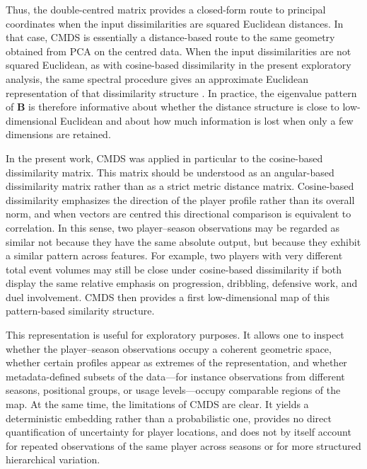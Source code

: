 Thus, the double-centred matrix provides a closed-form route to principal coordinates when the input dissimilarities are squared Euclidean distances. In that case, CMDS is essentially a distance-based route to the same geometry obtained from PCA on the centred data. When the input dissimilarities are not squared Euclidean, as with cosine-based dissimilarity in the present exploratory analysis, the same spectral procedure gives an approximate Euclidean representation of that dissimilarity structure \cite{cox2001mds,borg2005mds}. In practice, the eigenvalue pattern of $\mathbf{B}$ is therefore informative about whether the distance structure is close to low-dimensional Euclidean and about how much information is lost when only a few dimensions are retained.

In the present work, CMDS was applied in particular to the cosine-based dissimilarity matrix. This matrix should be understood as an angular-based dissimilarity matrix rather than as a strict metric distance matrix. Cosine-based dissimilarity emphasizes the direction of the player profile rather than its overall norm, and when vectors are centred this directional comparison is equivalent to correlation. In this sense, two player--season observations may be regarded as similar not because they have the same absolute output, but because they exhibit a similar pattern across features. For example, two players with very different total event volumes may still be close under cosine-based dissimilarity if both display the same relative emphasis on progression, dribbling, defensive work, and duel involvement. CMDS then provides a first low-dimensional map of this pattern-based similarity structure.

This representation is useful for exploratory purposes. It allows one to inspect whether the player--season observations occupy a coherent geometric space, whether certain profiles appear as extremes of the representation, and whether metadata-defined subsets of the data---for instance observations from different seasons, positional groups, or usage levels---occupy comparable regions of the map. At the same time, the limitations of CMDS are clear. It yields a deterministic embedding rather than a probabilistic one, provides no direct quantification of uncertainty for player locations, and does not by itself account for repeated observations of the same player across seasons or for more structured hierarchical variation.

